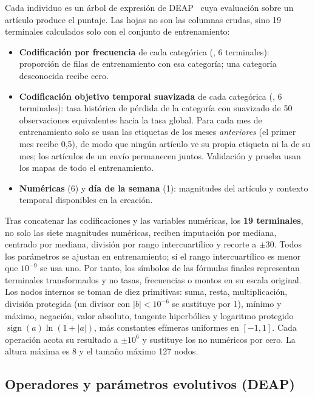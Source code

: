\documentclass[conference]{IEEEtran}
\newcommand{\col}[1]{\texttt{\detokenize{#1}}}
\begin{document}
Cada individuo es un árbol de expresión de DEAP~\cite{deap} cuya evaluación
sobre un artículo produce el puntaje. Las hojas no son las columnas crudas,
sino 19 terminales calculados solo con el conjunto de entrenamiento:
\begin{itemize}
\item \textbf{Codificación por frecuencia} de cada categórica
(\col{freq__*}, 6 terminales): proporción de filas de entrenamiento con esa
categoría; una categoría desconocida recibe cero.
\item \textbf{Codificación objetivo temporal suavizada} de cada categórica
(\col{past_target__*}, 6 terminales): tasa histórica de pérdida de la
categoría con suavizado de 50 observaciones equivalentes hacia la tasa global.
Para cada mes de entrenamiento solo se usan las etiquetas de los meses
\emph{anteriores} (el primer mes recibe 0,5), de modo que ningún artículo ve
su propia etiqueta ni la de su mes; los artículos de un envío permanecen
juntos. Validación y prueba usan los mapas de todo el entrenamiento.
\item \textbf{Numéricas} (6) y \textbf{día de la semana} (1): magnitudes del
artículo y contexto temporal disponibles en la creación.
\end{itemize}
Tras concatenar las codificaciones y las variables numéricas, los
\textbf{19 terminales}, no solo las siete magnitudes numéricas, reciben
imputación por mediana, centrado por mediana, división por rango
intercuartílico y recorte a $\pm 30$. Todos los parámetros se ajustan en
entrenamiento; si el rango intercuartílico es menor que $10^{-9}$ se usa uno.
Por tanto, los símbolos de las fórmulas finales representan terminales
transformados y no tasas, frecuencias o montos en su escala original.
Los nodos internos se toman de diez primitivas: suma, resta, multiplicación,
división protegida (un divisor con $|b|<10^{-6}$ se sustituye por 1), mínimo
y máximo, negación, valor absoluto, tangente hiperbólica y logaritmo protegido
$\operatorname{sign}(a)\ln(1+|a|)$, más constantes efímeras uniformes en
$[-1,1]$. Cada operación acota su resultado a $\pm 10^{6}$ y sustituye los no
numéricos por cero. La altura máxima es 8 y el tamaño máximo 127 nodos.

\subsection{Operadores y parámetros evolutivos (DEAP)}
\end{document}
